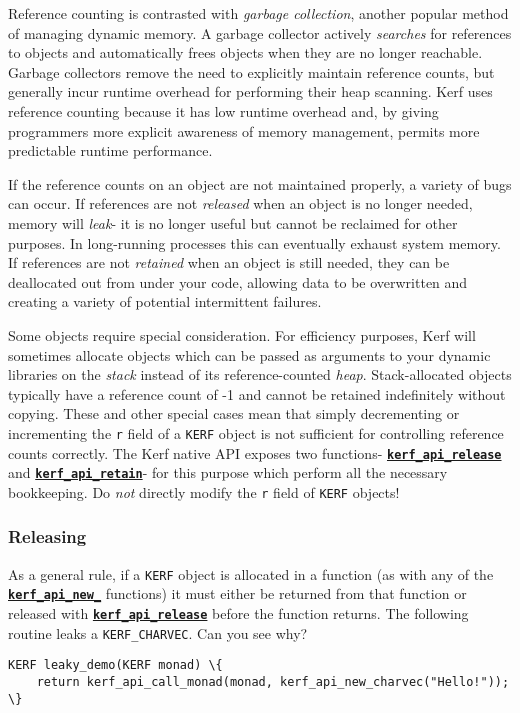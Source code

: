 \documentclass{article}
\newcommand{\ffi}[2]{\hyperref[ffi:#2]{\textbf{\texttt{#1}}}}
\begin{document}
\vspace{0.5cm}

Reference counting is contrasted with \emph{garbage collection}, another popular method of managing dynamic memory. A garbage collector actively \emph{searches} for references to objects and automatically frees objects when they are no longer reachable. Garbage collectors remove the need to explicitly maintain reference counts, but generally incur runtime overhead for performing their heap scanning. Kerf uses reference counting because it has low runtime overhead and, by giving programmers more explicit awareness of memory management, permits more predictable runtime performance.

\vspace{0.5cm}

If the reference counts on an object are not maintained properly, a variety of bugs can occur. If references are not \emph{released} when an object is no longer needed, memory will \emph{leak}- it is no longer useful but cannot be reclaimed for other purposes. In long-running processes this can eventually exhaust system memory. If references are not \emph{retained} when an object is still needed, they can be deallocated out from under your code, allowing data to be overwritten and creating a variety of potential intermittent failures.

\vspace{0.5cm}

Some objects require special consideration. For efficiency purposes, Kerf will sometimes allocate objects which can be passed as arguments to your dynamic libraries on the \emph{stack} instead of its reference-counted \emph{heap}. Stack-allocated objects typically have a reference count of -1 and cannot be retained indefinitely without copying. These and other special cases mean that simply decrementing or incrementing the \texttt{r} field of a \texttt{KERF} object is not sufficient for controlling reference counts correctly. The Kerf native API exposes two functions- \ffi{kerf\_api\_release}{kerfApiRelease} and \ffi{kerf\_api\_retain}{kerfApiRetain}- for this purpose which perform all the necessary bookkeeping. Do \emph{not} directly modify the \texttt{r} field of \texttt{KERF} objects!

\subsubsection{Releasing}
As a general rule, if a \texttt{KERF} object is allocated in a function (as with any of the \ffi{kerf\_api\_new\_}{kerfApiNewCharvec} functions) it must either be returned from that function or released with \ffi{kerf\_api\_release}{kerfApiRelease} before the function returns. The following routine leaks a \texttt{KERF\_CHARVEC}. Can you see why?
\begin{Verbatim}
KERF leaky_demo(KERF monad) \{
	return kerf_api_call_monad(monad, kerf_api_new_charvec("Hello!"));
\}
\end{Verbatim}
\end{document}
